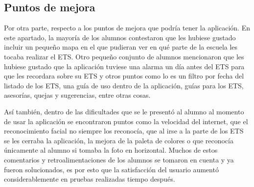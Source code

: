 \subsection{Puntos de mejora}
Por otra parte, respecto a los puntos de mejora que podría tener la aplicación.
En este apartado, la mayoría de los alumnos contestaron que les hubiese gustado incluir un pequeño mapa en el que pudieran ver en qué parte de la escuela les tocaba realizar el ETS. Otro pequeño conjunto de alumnos mencionaron que les hubiese gustado que la aplicación tuviese una alarma un día antes del ETS para que les recordara sobre su ETS y otros puntos como lo es un filtro por fecha del listado de los ETS, una guía de uso dentro de la aplicación, guías para los ETS, asesorías, quejas y sugerencias, entre otras cosas.

Así también, dentro de las dificultades que se le presentó al alumno al momento de usar la aplicación se encontraron puntos como la velocidad del internet, que el reconocimiento facial no siempre los reconocía, que al irse a la parte de los ETS se les cerraba la aplicación, la mejora de la paleta de colores o que reconocía únicamente al alumno si tomaba la foto en horizontal. 
Muchos de estos comentarios y retroalimentaciones de los alumnos se tomaron en cuenta y ya fueron solucionados, es por esto que la satisfacción del usuario aumentó considerablemente en pruebas realizadas tiempo después.

